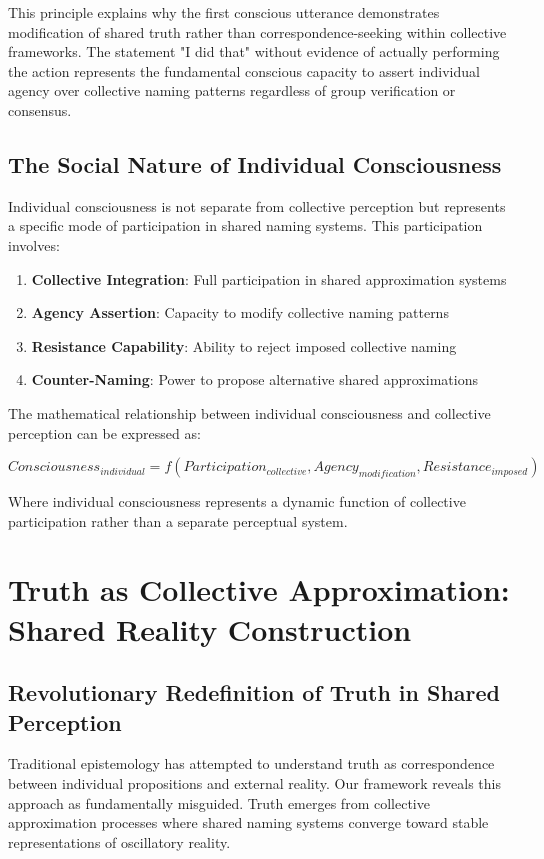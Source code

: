 \documentclass[12pt]{article}
\begin{document}
This principle explains why the first conscious utterance demonstrates modification of shared truth rather than correspondence-seeking within collective frameworks. The statement "I did that" without evidence of actually performing the action represents the fundamental conscious capacity to assert individual agency over collective naming patterns regardless of group verification or consensus.

\subsection{The Social Nature of Individual Consciousness}

Individual consciousness is not separate from collective perception but represents a specific mode of participation in shared naming systems. This participation involves:

\begin{enumerate}
\item \textbf{Collective Integration}: Full participation in shared approximation systems
\item \textbf{Agency Assertion}: Capacity to modify collective naming patterns
\item \textbf{Resistance Capability}: Ability to reject imposed collective naming
\item \textbf{Counter-Naming}: Power to propose alternative shared approximations
\end{enumerate}

The mathematical relationship between individual consciousness and collective perception can be expressed as:

$$Consciousness_{individual} = f(Participation_{collective}, Agency_{modification}, Resistance_{imposed})$$

Where individual consciousness represents a dynamic function of collective participation rather than a separate perceptual system.

\section{Truth as Collective Approximation: Shared Reality Construction}

\subsection{Revolutionary Redefinition of Truth in Shared Perception}

Traditional epistemology has attempted to understand truth as correspondence between individual propositions and external reality. Our framework reveals this approach as fundamentally misguided. Truth emerges from collective approximation processes where shared naming systems converge toward stable representations of oscillatory reality.
\end{document}

